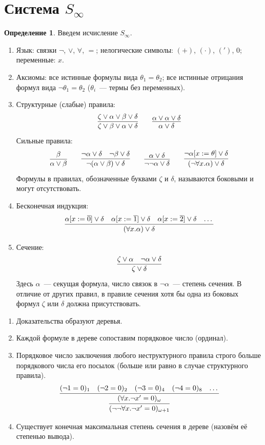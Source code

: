 \documentclass[a4paper,11pt]{article}
\theoremstyle{definition}
\newtheorem*{dfn}{Определение}
\begin{document}
\section{Система $S_\infty$}
\begin{dfn}
Введем исчисление $S_\infty$.
\begin{enumerate}
\item Язык: связки $\neg$, $\vee$, $\forall$, $=$; нелогические символы:
  $(+)$, $(\cdot)$, $(')$, $0$; переменные: $x$.
\item Аксиомы: все истинные формулы вида $\theta_1 = \theta_2$; все истинные
  отрицания формул вида $\neg\theta_1 = \theta_2$ ($\theta_i$~--- термы без
  переменных).
\item Структурные (слабые) правила:
  \[
  \infer{\zeta \vee \beta \vee \alpha \vee \delta}{\zeta \vee \alpha \vee \beta \vee \delta}
  \qquad
  \infer{\alpha \vee \delta}{\alpha \vee \alpha \vee \delta}
  \]
  Сильные правила:
  \[
  \infer{\alpha \vee \beta}{\beta}
  \qquad
  \infer{\neg(\alpha \vee \beta) \vee \delta}{\neg\alpha \vee \delta & \neg\beta \vee \delta}
  \qquad
  \infer{\neg\neg\alpha \vee \delta}{\alpha \vee \delta}
  \qquad
  \infer{(\neg\forall x.\alpha) \vee \delta}{\neg\alpha[x := \theta] \vee \delta}
  \]
  Формулы в правилах, обозначенные буквами $\zeta$ и $\delta$, называются
  боковыми и могут отсутствовать.
\item Бесконечная индукция:
  \[
  \infer{(\forall x.\alpha) \vee \delta}{\alpha[x := \overline{0}] \vee \delta & \alpha[x := \overline{1}] \vee \delta & \alpha[x := \overline{2}] \vee \delta & \dots}
  \]
\item Сечение:
  \[
  \infer{\zeta \vee \delta}{\zeta \vee \alpha & \neg\alpha \vee \delta}
  \]
  Здесь $\alpha$~--- секущая формула, число связок в $\neg\alpha$~--- степень
  сечения. В отличие от других правил, в правиле сечения хотя бы одна из боковых
  формул $\zeta$ или $\delta$ должна присутствовать.
\end{enumerate}
\begin{enumerate}
\item Доказательства образуют деревья.
\item Каждой формуле в дереве сопоставим порядковое число (ординал).
\item Порядковое число заключения любого неструктурного правила строго больше
  порядкового числа его посылок (больше или равно в случае структурного
  правила).
  \[
  \infer{(\neg\neg\forall x.\neg x' = 0)_{\omega+1}}{
    \infer{(\forall x.\neg x' = 0)_\omega}{(\neg 1 = 0)_1 & (\neg 2 = 0)_2 & (\neg 3 = 0)_4 & (\neg 4 = 0)_8 & \dots}}
  \]
\item Существует конечная максимальная степень сечения в дереве (назовём её
  степенью вывода).
\end{enumerate}
\end{dfn}
\end{document}
